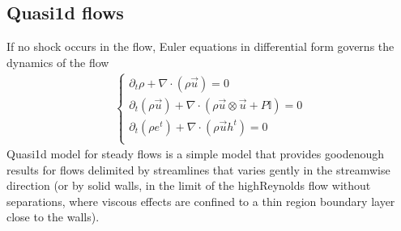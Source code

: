 \documentclass[letterpaper,10pt,english]{jupyterBook}
\begin{document}
\subsection{Quasi\sphinxhyphen{}1d flows}
\label{\detokenize{ch/fluids/compressible:quasi-1d-flows}}\label{\detokenize{ch/fluids/compressible:fluid-mechanics-compressible-inviscid-quasi-1d}}
\sphinxAtStartPar
If no shock occurs in the flow, Euler equations in differential form governs the dynamics of the flow
\begin{equation*}
\begin{split}\begin{cases}
  \partial_t \rho + \nabla \cdot (\rho \vec{u}) = 0 \\
  \partial_t \left( \rho \vec{u} \right) + \nabla \cdot (\rho \vec{u} \otimes \vec{u} + P \mathbb{I}) = 0 \\
  \partial_t \left( \rho e^t \right) + \nabla \cdot (\rho \vec{u} h^t) = 0 \\
\end{cases}\end{split}
\end{equation*}
\sphinxAtStartPar
Quasi\sphinxhyphen{}1d model for steady flows is a simple model that provides good\sphinxhyphen{}enough results for flows delimited by streamlines that varies gently in the streamwise direction (or by solid walls, in the limit of the high\sphinxhyphen{}Reynolds flow without separations, where viscous effects are confined to a thin region \sphinxhyphen{} boundary layer \sphinxhyphen{} close to the walls).
\end{document}
